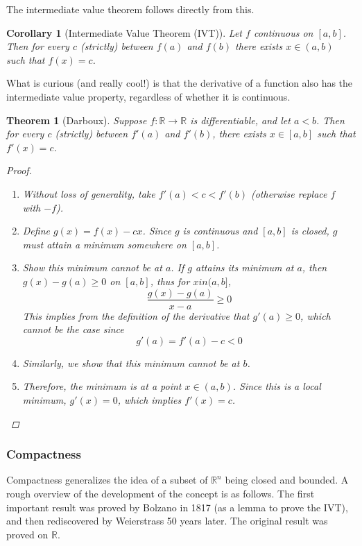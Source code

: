 \documentclass[10pt]{article}         %
\newtheorem{theorem}{Theorem}[section]
\newtheorem{corollary}{Corollary}[section]
\theoremstyle{remark}
\newcommand{\R}{\mathbb{R}}
\begin{document}
The intermediate value theorem follows directly from this.

\begin{corollary}[Intermediate Value Theorem (IVT)]Let $f$ continuous on $[a, b]$. Then for every $c$ (strictly) between $f(a)$ and $f(b)$ there exists $x \in (a, b)$ such that $f(x) = c$.
\end{corollary}

What is curious (and really cool!) is that the derivative of a function also has the intermediate value property, regardless of whether it is continuous.

\begin{theorem}[Darboux]
Suppose $f:\R \rightarrow \R$ is differentiable, and let $a < b$. Then for every $c$ (strictly) between $f'(a)$ and $f'(b)$, there exists $x \in [a, b]$ such that $f'(x) = c$.
\begin{proof}
\begin{enumerate}
    \item Without loss of generality, take $f'(a) < c < f'(b)$ (otherwise replace $f$ with $-f$).
    \item Define $g(x) = f(x) - cx$. Since $g$ is continuous and $[a,b]$ is closed, $g$ must attain a minimum somewhere on $[a,b]$.
    \item Show this minimum cannot be at $a$. If $g$ attains its minimum at $a$, then $g(x) - g(a) \geq 0$ on $[a, b]$, thus for $x in (a, b]$,
    \[
    \frac{g(x) - g(a)}{x-a} \geq 0
    \]
    This implies from the definition of the derivative that $g'(a) \geq 0$, which cannot be the case since 
    \[
    g'(a) = f'(a) - c < 0
    \]
    \item Similarly, we show that this minimum cannot be at $b$.
    \item Therefore, the minimum is at a point $x \in (a,b)$. Since this is a local minimum, $g'(x) = 0$, which implies $f'(x) = c$.
\end{enumerate}
\end{proof}
\end{theorem}

\subsubsection{Compactness}

Compactness generalizes the idea of a subset of $\R^n$ being closed and bounded. A rough overview of the development of the concept is as follows. The first important result was proved by Bolzano in 1817 (as a lemma to prove the IVT), and then rediscovered by Weierstrass 50 years later. The original result was proved on $\R$.
\end{document}
